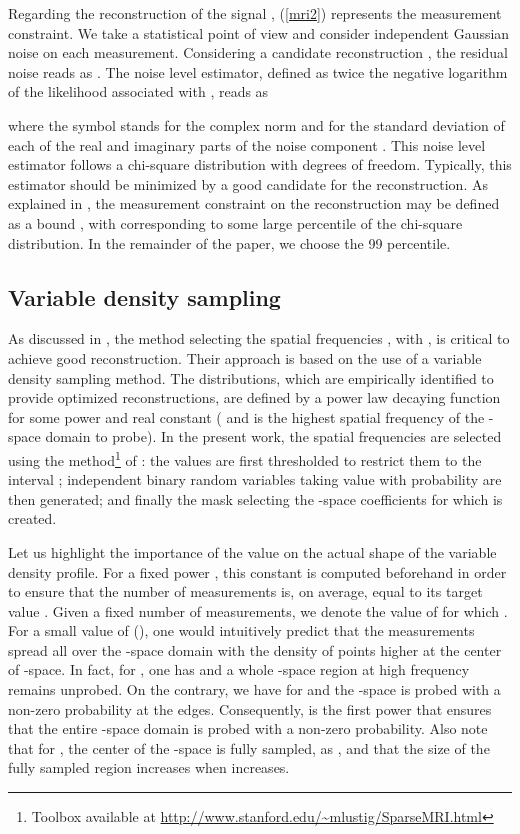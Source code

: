 \documentclass[10pt,draftcls, onecolumn]{IEEEtran}
\begin{document}
Regarding the reconstruction of the signal , (\ref{mri2}) represents the measurement constraint. We take a statistical point of view and consider independent Gaussian noise on each measurement. Considering a candidate reconstruction , the residual noise reads as . The noise level estimator, defined as twice the negative logarithm of the likelihood associated with , reads as

where the symbol  stands for the complex norm and  for the standard deviation of each of the real and imaginary parts of the noise component . This noise level estimator follows a chi-square distribution with  degrees of freedom. Typically, this estimator should be minimized by a good candidate for the reconstruction. As explained in \cite{candes06b}, the measurement constraint on the reconstruction may be defined as a bound , with  corresponding to some large percentile of the chi-square distribution. In the remainder of the paper, we choose the 99 percentile.

\subsection{Variable density sampling}
\label{sub:vds}

As discussed in \cite{lustig07}, the method selecting the spatial frequencies , with , is critical to achieve good reconstruction. Their approach is based on the use of a variable density sampling method. The distributions, which are empirically identified to provide optimized reconstructions, are defined by a power law decaying function  for some power  and real constant  ( and  is the highest spatial frequency of the -space domain to probe). In the present work, the spatial frequencies  are selected using the method\footnote{Toolbox available at \url{http://www.stanford.edu/~mlustig/SparseMRI.html}} of \cite{lustig07}: the values  are first thresholded to restrict them to the interval ;  independent binary random variables  taking value  with probability  are then generated; and finally the mask  selecting the -space coefficients for which  is created. 

Let us highlight the importance of the value  on the actual shape of the variable density profile. For a fixed power , this constant is computed beforehand in order to ensure that the number of measurements is, on average, equal to its target value . Given a fixed number  of measurements, we denote  the value of  for which . For a small value of  (), one would intuitively predict that the measurements spread all over the -space domain with the density of points higher at the center of -space. In fact, for , one has  and a whole -space region at high frequency remains unprobed. On the contrary, we have  for  and the -space is probed with a non-zero probability at the edges. Consequently,  is the first power that ensures that the entire -space domain is probed with a non-zero probability. Also note that for , the center of the -space is fully sampled, as , and that the size of the fully sampled region increases when  increases. 
\end{document}
